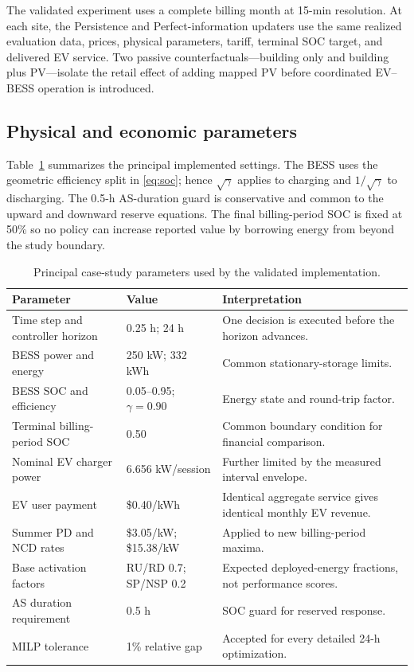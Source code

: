 \documentclass[final,5p,times]{elsarticle}
\begin{document}
The validated experiment uses a complete billing month at 15-min resolution. At each site, the Persistence and Perfect-information updaters use the same realized evaluation data, prices, physical parameters, tariff, terminal SOC target, and delivered EV service. Two passive counterfactuals---building only and building plus PV---isolate the retail effect of adding mapped PV before coordinated EV--BESS operation is introduced.

\subsection{Physical and economic parameters}
Table~\ref{tab:case_parameters} summarizes the principal implemented settings. The BESS uses the geometric efficiency split in \eqref{eq:soc}; hence $\sqrt{\gamma}$ applies to charging and $1/\sqrt{\gamma}$ to discharging. The 0.5-h AS-duration guard is conservative and common to the upward and downward reserve equations. The final billing-period SOC is fixed at 50\% so no policy can increase reported value by borrowing energy from beyond the study boundary.

\begin{table}[!t]
\centering
\caption{Principal case-study parameters used by the validated implementation.}
\label{tab:case_parameters}
\small
\begin{tabularx}{\textwidth}{@{}p{}p{}X@{}}
\toprule
Parameter & Value & Interpretation \\
\midrule
Time step and controller horizon & 0.25 h; 24 h & One decision is executed before the horizon advances. \\
BESS power and energy & 250 kW; 332 kWh & Common stationary-storage limits. \\
BESS SOC and efficiency & 0.05--0.95; $\gamma=0.90$ & Energy state and round-trip factor. \\
Terminal billing-period SOC & 0.50 & Common boundary condition for financial comparison. \\
Nominal EV charger power & 6.656 kW/session & Further limited by the measured interval envelope. \\
EV user payment & \$0.40/kWh & Identical aggregate service gives identical monthly EV revenue. \\
Summer PD and NCD rates & \$3.05/kW; \$15.38/kW & Applied to new billing-period maxima. \\
Base activation factors & RU/RD 0.7; SP/NSP 0.2 & Expected deployed-energy fractions, not performance scores. \\
AS duration requirement & 0.5 h & SOC guard for reserved response. \\
MILP tolerance & 1\% relative gap & Accepted for every detailed 24-h optimization. \\
\bottomrule
\end{tabularx}
\end{table}
\end{document}
